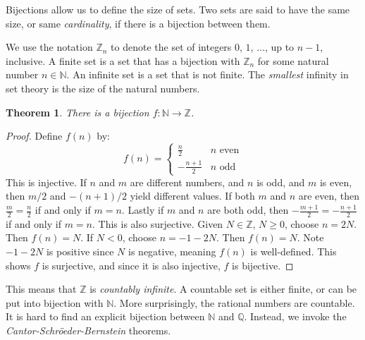 \documentclass{article}
\theoremstyle{plain}
\newtheorem{theorem}{Theorem}[section]
\theoremstyle{normal}
\newenvironment{notation}{%
    \pushQED{\qed}\renewcommand{\qedsymbol}{$\blacksquare$}\notationx%
}{%
    \popQED\endnotationx%
}
\begin{document}
        Bijections allow us to define the size of sets. Two sets are said to
        have the same size, or same \textit{cardinality}, if there is a
        bijection between them.
        \begin{notation}
            We use the notation $\mathbb{Z}_{n}$ to denote the set of integers
            $0$, $1$, $\dots$, up to $n-1$, inclusive.
        \end{notation}
        A finite set is a set that has a bijection with $\mathbb{Z}_{n}$ for
        some natural number $n\in\mathbb{N}$. An infinite set is a set that is
        not finite. The \textit{smallest} infinity in set theory is the size
        of the natural numbers.
        \begin{theorem}
            There is a bijection $f:\mathbb{N}\rightarrow\mathbb{Z}$.
        \end{theorem}
        \begin{proof}
            Define $f(n)$ by:
            \begin{equation}
                f(n)=
                \begin{cases}
                    \frac{n}{2}&n\textrm{ even}\\
                    -\frac{n+1}{2}&n\textrm{ odd}
                \end{cases}
            \end{equation}
            This is injective. If $n$ and $m$ are different numbers, and
            $n$ is odd, and $m$ is even, then $m/2$ and $-(n+1)/2$ yield
            different values. If both $m$ and $n$ are even,
            then $\frac{m}{2}=\frac{n}{2}$ if and only if $m=n$. Lastly if
            $m$ and $n$ are both odd, then
            $-\frac{m+1}{2}=-\frac{n+1}{2}$ if and only if $m=n$. This is
            also surjective. Given $N\in\mathbb{Z}$, $N\geq{0}$, choose
            $n=2N$. Then $f(n)=N$. If $N<0$, choose
            $n=-1-2N$. Then $f(n)=N$. Note $-1-2N$ is positive since $N$ is
            negative, meaning $f(n)$ is well-defined. This shows
            $f$ is surjective, and since it is also injective, $f$ is bijective.
        \end{proof}
        This means that $\mathbb{Z}$ is \textit{countably infinite}. A
        countable set is either finite, or can be put into bijection with
        $\mathbb{N}$. More surprisingly, the rational numbers are countable.
        It is hard to find an explicit bijection between $\mathbb{N}$ and
        $\mathbb{Q}$. Instead, we invoke the
        \textit{Cantor-Schr\"{o}eder-Bernstein} theorems.
\end{document}
